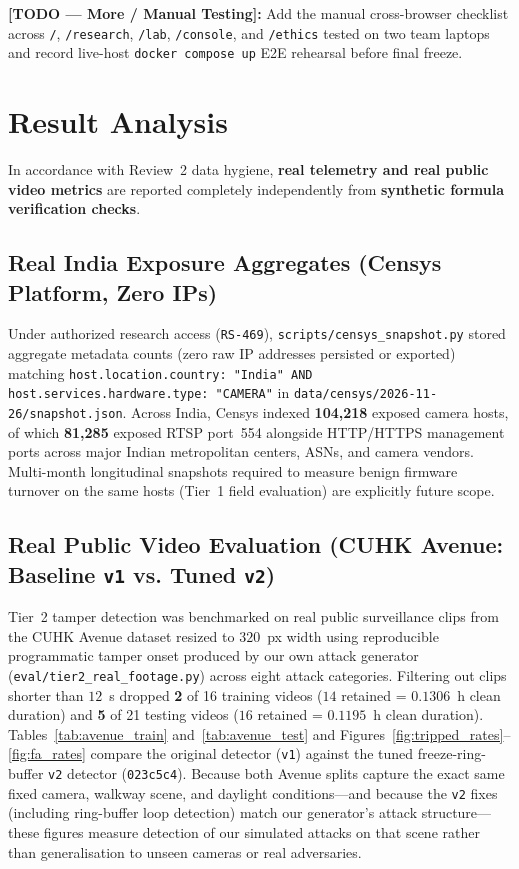 \textbf{[TODO — More / Manual Testing]:} Add the manual cross-browser checklist across \texttt{/}, \texttt{/research}, \texttt{/lab}, \texttt{/console}, and \texttt{/ethics} tested on two team laptops and record live-host \texttt{docker compose up} E2E rehearsal before final freeze.

\section{Result Analysis}
In accordance with Review~2 data hygiene, \textbf{real telemetry and real public video metrics} are reported completely independently from \textbf{synthetic formula verification checks}.

\subsection{Real India Exposure Aggregates (Censys Platform, Zero IPs)}
Under authorized research access (\texttt{RS-469}), \texttt{scripts/censys\_snapshot.py} stored aggregate metadata counts (zero raw IP addresses persisted or exported) matching \texttt{host.location.country: "India" AND host.services.hardware.type: "CAMERA"} in \texttt{data/censys/2026-11-26/snapshot.json}. Across India, Censys indexed \textbf{104,218} exposed camera hosts, of which \textbf{81,285} exposed RTSP port~554 alongside HTTP/HTTPS management ports across major Indian metropolitan centers, ASNs, and camera vendors. Multi-month longitudinal snapshots required to measure benign firmware turnover on the same hosts (Tier~1 field evaluation) are explicitly future scope.

\subsection{Real Public Video Evaluation (CUHK Avenue: Baseline \texttt{v1} vs. Tuned \texttt{v2})}
Tier~2 tamper detection was benchmarked on real public surveillance clips from the CUHK Avenue dataset resized to $320$~px width using reproducible programmatic tamper onset produced by our own attack generator (\texttt{eval/tier2\_real\_footage.py}) across eight attack categories. Filtering out clips shorter than $12$~s dropped \textbf{2} of 16 training videos ($14$ retained = $0.1306$~h clean duration) and \textbf{5} of 21 testing videos ($16$ retained = $0.1195$~h clean duration). Tables~\ref{tab:avenue_train} and~\ref{tab:avenue_test} and Figures~\ref{fig:tripped_rates}--\ref{fig:fa_rates} compare the original detector (\texttt{v1}) against the tuned freeze-ring-buffer \texttt{v2} detector (\texttt{023c5c4}). Because both Avenue splits capture the exact same fixed camera, walkway scene, and daylight conditions---and because the \texttt{v2} fixes (including ring-buffer loop detection) match our generator's attack structure---these figures measure detection of our simulated attacks on that scene rather than generalisation to unseen cameras or real adversaries.

